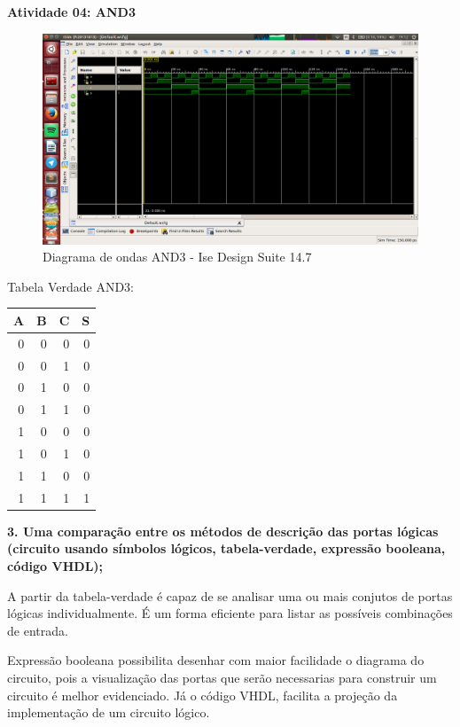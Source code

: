 \documentclass[12pts]{article}
\begin{document}
\newpage
\textbf{Atividade 04: AND3}

\begin{figure}[!htb]
  \centering
  \includegraphics[scale=0.3]{Atividade04}
  \caption{Diagrama de ondas AND3 - Ise Design Suite 14.7}
  \label{figRotulo}
\end{figure}

Tabela Verdade AND3:

\begin{center}
	\begin{tabular}{|r|r|r|r|}
		\hline
		A & B & C & S\\
		\hline
		0 & 0 & 0 & 0\\
		\hline
		0 & 0 & 1 & 0\\
		\hline
		0 & 1 & 0 & 0\\
		\hline
		0 & 1 & 1 & 0\\
		\hline
		1 & 0 & 0 & 0\\
		\hline
		1 & 0 & 1 & 0\\
		\hline
		1 & 1 & 0 & 0\\
		\hline
		1 & 1 & 1 & 1\\
		\hline
	\end{tabular}
\end{center}

\newpage
\textbf{3. Uma comparação entre os métodos de descrição das portas lógicas (circuito usando símbolos lógicos, tabela-verdade, expressão booleana, código VHDL);}
\singlespacing

	A partir da tabela-verdade é capaz de se analisar uma ou mais conjutos de portas lógicas individualmente. É um forma eficiente para listar as possíveis combinações de entrada.

	Expressão booleana possibilita desenhar com maior facilidade o diagrama do circuito, pois a visualização das portas que serão necessarias para construir um circuito é melhor evidenciado. Já o código VHDL, facilita a projeção da implementação de um circuito lógico.
\end{document}
